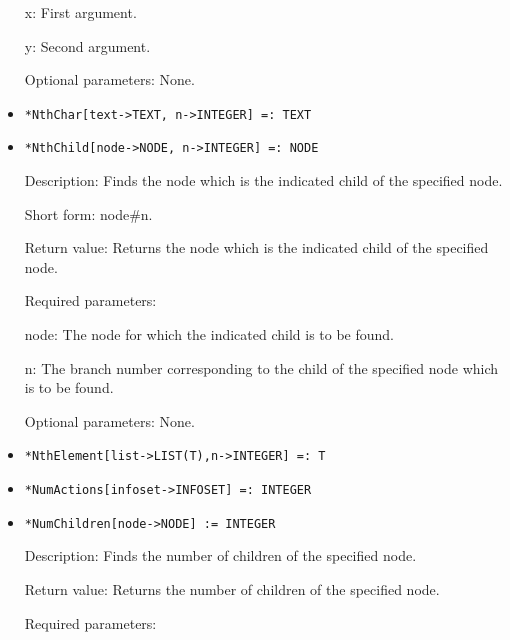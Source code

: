 \begin{itemize}
\bd
\item
[x:] First argument.
\item
[y:] Second argument.
\ed

\item
[Optional parameters:] None.

\ed

\item
\protect \large \begin{verbatim}
*NthChar[text->TEXT, n->INTEGER] =: TEXT
\end{verbatim}\normalsize

\item
\protect \large \begin{verbatim} 
*NthChild[node->NODE, n->INTEGER] =: NODE
\end{verbatim}\normalsize

\bd
\item
[Description:] Finds the node which is the indicated child of the
specified node.  
\item
[Short form:] node\#n.
\item
[Return value:] Returns the node which is the indicated child of the
specified node.
\item
[Required parameters:]\hfil\null
	  
\bd
\item
[node:] The node for which the indicated child is to be found.
\item
[n:] The branch number corresponding to the child of the specified node
which is to be found.
\ed

\item 
[Optional parameters:] None.
\ed

\item
\protect \large \begin{verbatim}
*NthElement[list->LIST(T),n->INTEGER] =: T 
\end{verbatim}\normalsize

\item
\protect \large \begin{verbatim}
*NumActions[infoset->INFOSET] =: INTEGER
\end{verbatim}\normalsize

\item
\protect \large \begin{verbatim}
*NumChildren[node->NODE] := INTEGER
\end{verbatim}\normalsize

\bd
\item
[Description:] Finds the number of children of the specified node.
\item
[Return value:] Returns the number of children of the specified node.
\item
[Required parameters:]\hfil\null


\end{itemize}
